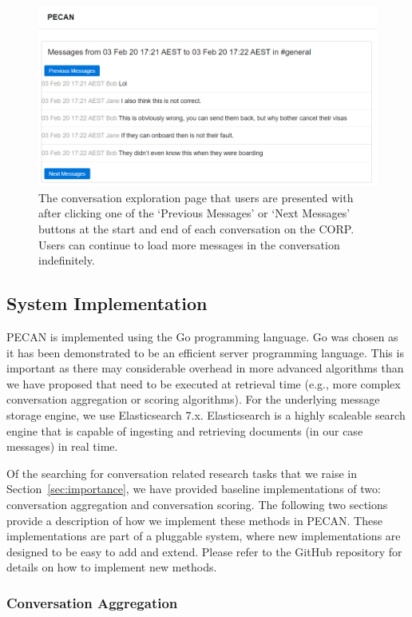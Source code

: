 \begin{figure}
	\includegraphics[width=\linewidth]{traversing}
	\caption{The conversation exploration page that users are presented with after clicking one of the `Previous Messages' or `Next Messages' buttons at the start and end of each conversation on the CORP. Users can continue to load more messages in the conversation indefinitely.}
	\label{fig:traversing}
\end{figure}


\subsection{System Implementation}

PECAN is implemented using the Go programming language. Go was chosen as it has been demonstrated to be an efficient server programming language. This is important as there may considerable overhead in more advanced algorithms than we have proposed that need to be executed at retrieval time (e.g., more complex conversation aggregation or scoring algorithms). For the underlying message storage engine, we use Elasticsearch 7.x. Elasticsearch is a highly scaleable search engine that is capable of ingesting and retrieving documents (in our case messages) in real time.

Of the searching for conversation related research tasks that we raise in Section~\ref{sec:importance}, we have provided baseline implementations of two: conversation aggregation and conversation scoring. The following two sections provide a description of how we implement these methods in PECAN. These implementations are part of a pluggable system, where new implementations are designed to be easy to add and extend. Please refer to the GitHub repository for details on how to implement new methods.

\subsubsection{Conversation Aggregation}
\label{sec:conv-agg}

